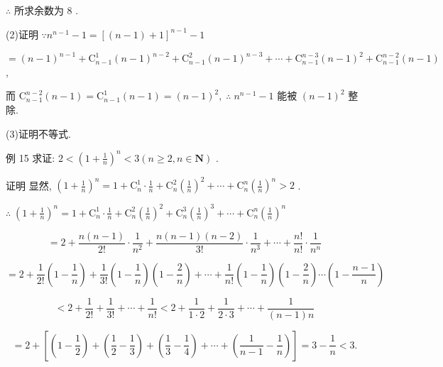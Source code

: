 \documentclass[10pt]{article}
\begin{document}
\(\therefore\) 所求余数为 8 .

(2)证明 \(\because {n}^{n - 1} - 1 = {\left\lbrack  \left( n - 1\right)  + 1\right\rbrack  }^{n - 1} - 1\)

\(= {\left( n - 1\right) }^{n - 1} + {\mathrm{C}}_{n - 1}^{1}{\left( n - 1\right) }^{n - 2} + {\mathrm{C}}_{n - 1}^{2}{\left( n - 1\right) }^{n - 3} + \cdots  + {\mathrm{C}}_{n - 1}^{n - 3}{\left( n - 1\right) }^{2} + {\mathrm{C}}_{n - 1}^{n - 2}\left( {n - 1}\right)\) ,

而 \({\mathrm{C}}_{n - 1}^{n - 2}\left( {n - 1}\right)  = {\mathrm{C}}_{n - 1}^{1}\left( {n - 1}\right)  = {\left( n - 1\right) }^{2},\;\therefore \;{n}^{n - 1} - 1\) 能被 \({\left( n - 1\right) }^{2}\) 整除.

(3)证明不等式.

例 15 求证: \(2 < {\left( 1 + \frac{1}{n}\right) }^{n} < 3\left( {n \geq  2,n \in  \mathbf{N}}\right)\) .

证明 显然, \({\left( 1 + \frac{1}{n}\right) }^{n} = 1 + {\mathrm{C}}_{n}^{1} \cdot  \frac{1}{n} + {\mathrm{C}}_{n}^{2}{\left( \frac{1}{n}\right) }^{2} + \cdots  + {\mathrm{C}}_{n}^{n}{\left( \frac{1}{n}\right) }^{n} > 2\) .

\(\therefore \;{\left( 1 + \frac{1}{n}\right) }^{n} = 1 + {\mathrm{C}}_{n}^{1} \cdot  \frac{1}{n} + {\mathrm{C}}_{n}^{2}{\left( \frac{1}{n}\right) }^{2} + {\mathrm{C}}_{n}^{3}{\left( \frac{1}{n}\right) }^{3} + \cdots  + {\mathrm{C}}_{n}^{n}{\left( \frac{1}{n}\right) }^{n}\)

\[
= 2 + \frac{n\left( {n - 1}\right) }{2!} \cdot  \frac{1}{{n}^{2}} + \frac{n\left( {n - 1}\right) \left( {n - 2}\right) }{3!} \cdot  \frac{1}{{n}^{3}} + \cdots  + \frac{n!}{n!} \cdot  \frac{1}{{n}^{n}}
\]

\[
= 2 + \frac{1}{2!}\left( {1 - \frac{1}{n}}\right)  + \frac{1}{3!}\left( {1 - \frac{1}{n}}\right) \left( {1 - \frac{2}{n}}\right)  + \cdots  + \frac{1}{n!}\left( {1 - \frac{1}{n}}\right) \left( {1 - \frac{2}{n}}\right) \cdots \left( {1 - \frac{n - 1}{n}}\right)
\]

\[
< 2 + \frac{1}{2!} + \frac{1}{3!} + \cdots  + \frac{1}{n!} < 2 + \frac{1}{1 \cdot  2} + \frac{1}{2 \cdot  3} + \cdots  + \frac{1}{\left( {n - 1}\right) n}
\]

\[
= 2 + \left\lbrack  {\left( {1 - \frac{1}{2}}\right)  + \left( {\frac{1}{2} - \frac{1}{3}}\right)  + \left( {\frac{1}{3} - \frac{1}{4}}\right)  + \cdots  + \left( {\frac{1}{n - 1} - \frac{1}{n}}\right) }\right\rbrack   = 3 - \frac{1}{n} < 3.
\]
\end{document}
